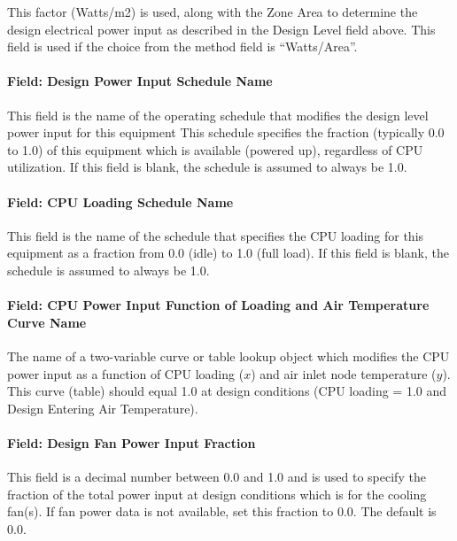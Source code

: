 This factor (Watts/m2) is used, along with the Zone Area to determine the design electrical power input as described in the Design Level field above. This field is used if the choice from the method field is ``Watts/Area''.

\paragraph{Field: Design Power Input Schedule Name}\label{field-design-power-input-schedule-name}

This field is the name of the operating schedule that modifies the design level power input for this equipment This schedule specifies the fraction (typically 0.0 to 1.0) of this equipment which is available (powered up), regardless of CPU utilization. If this field is blank, the schedule is assumed to always be 1.0.

\paragraph{Field: CPU Loading Schedule Name}\label{field-cpu-loading-schedule-name}

This field is the name of the schedule that specifies the CPU loading for this equipment as a fraction from 0.0 (idle) to 1.0 (full load). If this field is blank, the schedule is assumed to always be 1.0.

\paragraph{Field: CPU Power Input Function of Loading and Air Temperature Curve Name}\label{field-cpu-power-input-function-of-loading-and-air-temperature-curve-name}

The name of a two-variable curve or table lookup object which modifies the CPU power input as a function of CPU loading ($x$) and air inlet node temperature ($y$). This curve (table) should equal 1.0 at design conditions (CPU loading = 1.0 and Design Entering Air Temperature).

\paragraph{Field: Design Fan Power Input Fraction}\label{field-design-fan-power-input-fraction}

This field is a decimal number between 0.0 and 1.0 and is used to specify the fraction of the total power input at design conditions which is for the cooling fan(s). If fan power data is not available, set this fraction to 0.0. The default is 0.0.

